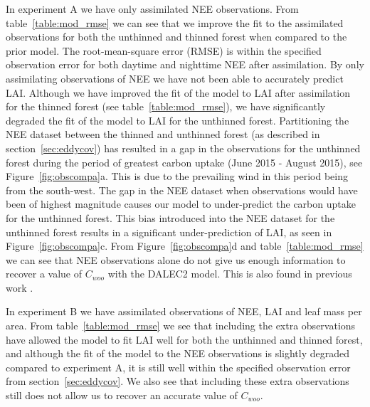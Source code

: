 \documentclass[draft,linenumbers]{agujournal}
\begin{document}
In experiment A we have only assimilated NEE observations. From table~\ref{table:mod_rmse} we can see that we improve the fit to the assimilated observations for both the unthinned and thinned forest when compared to the prior model. The root-mean-square error (RMSE) is within the specified observation error for both daytime and nighttime NEE after assimilation. By only assimilating observations of NEE we have not been able to accurately predict LAI. Although we have improved the fit of the model to LAI after assimilation for the thinned forest (see table~\ref{table:mod_rmse}), we have significantly degraded the fit of the model to LAI for the unthinned forest. Partitioning the NEE dataset between the thinned and unthinned forest (as described in section~\ref{sec:eddycov}) has resulted in a gap in the observations for the unthinned forest during the period of greatest carbon uptake (June 2015 - August 2015), see Figure~\ref{fig:obscompa}a. This is due to the prevailing wind in this period being from the south-west. The gap in the NEE dataset when observations would have been of highest magnitude causes our model to under-predict the carbon uptake for the unthinned forest. This bias introduced into the NEE dataset for the unthinned forest results in a {\color{blue}significant} under-prediction of LAI, as seen in Figure~\ref{fig:obscompa}c. From Figure~\ref{fig:obscompa}d and table~\ref{table:mod_rmse} we can see that NEE observations alone do not give us enough information to recover a value of \(C_{woo}\) with the DALEC2 model. This is also found in previous work \citep{fox2009reflex}.

In experiment B we have assimilated observations of NEE, LAI and leaf mass per area. From table~\ref{table:mod_rmse} we see that including the extra observations have allowed the model to fit LAI well for both the unthinned and thinned forest, and although the fit of the model to the NEE observations is slightly degraded {\color{blue}compared to experiment A}, it is still well within the specified observation error from section~\ref{sec:eddycov}. We also see that including these extra observations still does not allow us to recover an accurate value of \(C_{woo}\).      
\end{document}
